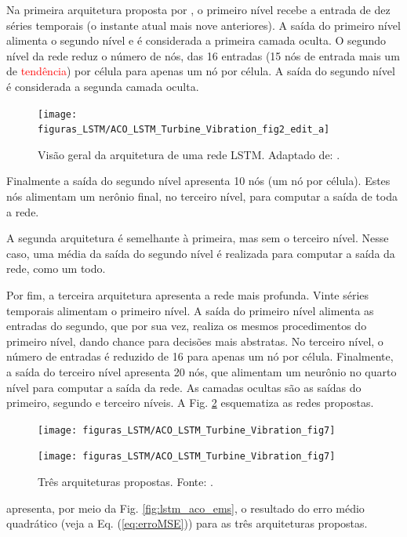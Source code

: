 Na primeira arquitetura proposta por , o primeiro nível recebe a entrada de dez séries temporais (o instante atual mais nove anteriores). A saída do primeiro nível alimenta o segundo nível e é considerada a primeira camada oculta. O segundo nível da rede reduz o número de nós, das 16 entradas (15 nós de entrada mais um de \textcolor{red}{tendência}) por célula para apenas um nó por célula. A saída do segundo nível é considerada a segunda camada oculta. 

\begin{figure}[H]
	\centering
	{\texttt{[image: figuras\_LSTM/ACO\_LSTM\_Turbine\_Vibration\_fig2\_edit\_a]}}
	{\caption{Visão geral da arquitetura de uma rede LSTM. Adaptado de: .}}
	\label{fig:lstm_aco_arq}
\end{figure}

Finalmente a saída do segundo nível apresenta 10 nós (um nó por célula). Estes nós alimentam um nerônio final, no terceiro nível, para computar a saída de toda a rede. 

A segunda arquitetura é semelhante à primeira, mas sem o terceiro nível. Nesse caso, uma média da saída do segundo nível é realizada para computar a saída da rede, como um todo. 

Por fim, a terceira arquitetura apresenta a rede mais profunda. Vinte séries temporais alimentam o primeiro nível. A saída do primeiro nível alimenta as entradas do segundo, que por sua vez, realiza os mesmos procedimentos do primeiro nível, dando chance para decisões mais abstratas. No terceiro nível, o número de entradas é reduzido de 16 para apenas um nó por célula. Finalmente, a saída do terceiro nível apresenta 20 nós, que alimentam um neurônio no quarto nível para computar a saída da rede. As camadas ocultas são as saídas do primeiro, segundo e terceiro níveis. A Fig. \ref{fig:lstm_aco_3arqs} esquematiza as redes propostas.
\begin{figure}[H]
	\centering
	{\texttt{[image: figuras\_LSTM/ACO\_LSTM\_Turbine\_Vibration\_fig7]}}
\end{figure}

\begin{figure}[H]
	\centering
	{\texttt{[image: figuras\_LSTM/ACO\_LSTM\_Turbine\_Vibration\_fig7]}}
	\caption{Três arquiteturas propostas. Fonte: .}
	\label{fig:lstm_aco_3arqs}
\end{figure}

 apresenta, por meio da Fig. \ref{fig:lstm_aco_ems}, o resultado do erro médio quadrático (veja a Eq. (\ref{eq:erroMSE})) para as três arquiteturas propostas.

